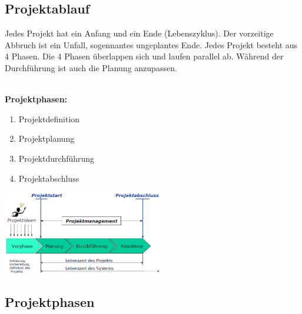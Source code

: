 \subsection{Projektablauf}
Jedes Projekt hat ein Anfang und ein Ende (Lebenszyklus). Der vorzeitige Abbruch ist ein Unfall, sogennantes ungeplantes Ende. Jedes Projekt besteht aus 4 Phasen. Die 4 Phasen überlappen sich und laufen parallel ab. Während der Durchführung ist auch die Planung anzupassen.  \\
\\
\begin{minipage}{6cm}
	\textbf{Projektphasen:}
	\begin{enumerate}
		\item Projektdefinition
		\item Projektplanung
		\item Projektdurchführung
		\item Projektabschluss
	\end{enumerate}
\end{minipage}
\begin{minipage}{7cm}
	\includegraphics[width=7cm]{images/projektablauf.png}
\end{minipage}

\subsection{Projektphasen}
